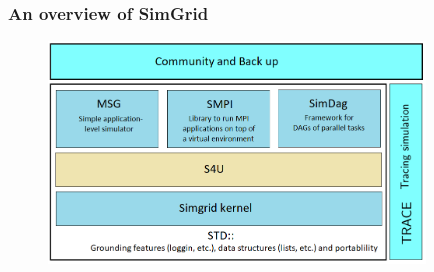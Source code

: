 \begin{frame}\frametitle{An overview of SimGrid}

\begin{figure}
  \begin{center}
    \includegraphics[width=10cm]{figures/simgridplan1.png}
  \end{center}
\end{figure}
\end{frame}